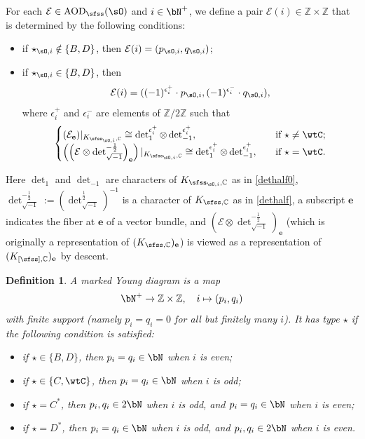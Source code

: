 \documentclass[11pt,a4paper]{amsart}
\newcommand{\CE}{{\mathcal {E}}}
\newcommand{\Z}{\mathbb{Z}}
\numberwithin{equation}{section}
\newtheorem{defn}[thm]{Definition}
\theoremstyle{remark}
\def\AOD{\mathrm{AOD}}
\begin{document}
For each $\CE\in \AOD_\sfss(\sO)$ and $i\in \bN^+$, we define a pair   $\CE(i)\in \Z\times \Z$ that is determined by the following conditions:
\begin{itemize}
    \item if $\star_{\sO,i}\notin\{B,D\}$, then $\CE(i)=(p_{\sO,i},q_{\sO,i})$;
    \item if $\star_{\sO,i}\in\{B,D\}$, then
    \[
    \CE(i)=((-1)^{\epsilon_i^+} \cdot p_{\sO,i}, (-1)^{\epsilon_i^-}\cdot  q_{\sO,i}),
    \]
    where $\epsilon_i^+$ and $\epsilon_i^-$ are elements of $\Z/2\Z$ such that
   \[
   \begin{cases}
       (\CE_{\mathbf e})|_{K_{\sfss_{\sO,i},\C}}\cong \det_1^{\epsilon_i^+} \otimes \det_{-1}^{\epsilon_i^+},\quad &\textrm{if $\star\neq \wtC$};\\
       \left(\left(\CE\otimes \det_{\sqrt{-1}}^{-\frac{1}{2}}\right)_{\mathbf e}\right)|_{K_{\sfss_{\sO,i},\C}}\cong \det_1^{\epsilon_i^+} \otimes \det_{-1}^{\epsilon_i^+},\quad &\textrm{if $\star= \wtC$}.
    \end{cases}
   \]
\end{itemize}
 Here $\det_{1}$ and $\det_{-1}$ are characters of $K_{\sfss_{\sO,i},\C}$ as in \eqref{dethalf0},  $\det_{\sqrt{-1}}^{-\frac{1}{2}}:=\left(\det_{\sqrt{-1}}^{\frac{1}{2}}\right)^{-1}$ is a character of $K_{\sfss, \C}$ as in \eqref{dethalf}, a subscript $\mathbf e$ indicates the fiber at $\mathbf e$ of a vector bundle, and  $\left(\CE\otimes \det_{\sqrt{-1}}^{-\frac{1}{2}}\right)_{\mathbf e}$ (which is originally a representation of $(K_{\sfss,\C})_\mathbf e$) is viewed as a representation of $(K_{[\sfss],\C})_\mathbf e$ by descent. 



\begin{defn}
A marked Young diagram  is a map
 \[
 \bN^+\rightarrow \Z\times \Z,\quad i\mapsto (p_i,q_i)
 \]
 with finite support (namely $p_i=q_i=0$ for all but finitely many $i$). It has  type $\star$ if the following condition is satisfied: 
 \begin{itemize}
     \item if $\star\in\{B,D\}$, then $p_i=q_i\in \bN$ when $i$ is even;
     \item if $\star\in\{C,\wtC\}$, then $p_i=q_i\in \bN$ when $i$ is odd;
     \item if $\star=C^*$, then $p_i, q_i\in 2\bN$ when $i$ is odd, and $p_i= q_i\in \bN$  when $i$ is even;
     \item if $\star=D^*$, then  $p_i= q_i\in \bN$  when $i$ is odd, and $p_i, q_i\in 2\bN$  when $i$ is even.
 \end{itemize}
\end{defn}
\end{document}
